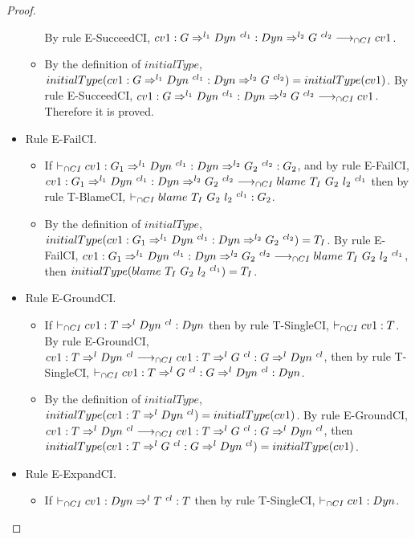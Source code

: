 \documentclass[a4paper]{article}
\begin{document}
\begin{proof}
\begin{itemize}
\begin{itemize}
        By rule E-SucceedCI, $cv1 : G \Rightarrow^{l_1} Dyn\ ^{cl_1} : Dyn \Rightarrow^{l_2} G\ ^{cl_2} \longrightarrow_{\cap CI} cv1$.
        \item By the definition of $initialType$, $initialType(cv1 : G \Rightarrow^{l_1} \Dyn\ ^{cl_1} : \Dyn \Rightarrow^{l_2} G\ ^{cl_2}) = initialType(cv1)$.
        By rule E-SucceedCI, $cv1 : G \Rightarrow^{l_1} Dyn\ ^{cl_1} : Dyn \Rightarrow^{l_2} G\ ^{cl_2} \longrightarrow_{\cap CI} cv1$.
        Therefore it is proved.
    \end{itemize}
    \item Rule E-FailCI.
    \begin{itemize}
        \item If $\vdash_{\cap CI} cv1 : G_1 \Rightarrow^{l_1} Dyn\ ^{cl_1} : Dyn \Rightarrow^{l_2} G_2\ ^{cl_2} : G_2$, and by rule E-FailCI, $cv1 : G_1 \Rightarrow^{l_1} \Dyn\ ^{cl_1} : \Dyn \Rightarrow^{l_2} G_2\ ^{cl_2} \cios \blamecast{T_I}{G_2}{l_2}{cl_1}$ then by rule T-BlameCI, $\vdash_{\cap CI} blame\ T_I\ G_2\ l_2\ ^{cl_1} : G_2$.
        \item By the definition of $initialType$, $initialType(cv1 : G_1 \Rightarrow^{l_1} \Dyn\ ^{cl_1} : \Dyn \Rightarrow^{l_2} G_2\ ^{cl_2}) = T_I$.
        By rule E-FailCI, $cv1 : G_1 \Rightarrow^{l_1} \Dyn\ ^{cl_1} : \Dyn \Rightarrow^{l_2} G_2\ ^{cl_2} \cios \blamecast{T_I}{G_2}{l_2}{cl_1}$, then $initialType(blame\ T_I\ G_2\ l_2\ ^{cl_1}) = T_I$.
    \end{itemize}
    \item Rule E-GroundCI.
    \begin{itemize}
        \item If $\cits cv1 : T \Rightarrow^l \Dyn\ ^{cl} : \Dyn$ then by rule T-SingleCI, $\vdash_{\cap CI} cv1 : T$.
        By rule E-GroundCI, $cv1 : T \Rightarrow^l Dyn\ ^{cl} \longrightarrow_{\cap CI} cv1 : T \Rightarrow^l G\ ^{cl} : G \Rightarrow^l Dyn\ ^{cl}$, then by rule T-SingleCI, $\vdash_{\cap CI} cv1 : T \Rightarrow^l G\ ^{cl} : G \Rightarrow^l Dyn\ ^{cl} : Dyn$.
        \item By the definition of $initialType$, $initialType(cv1 : T \Rightarrow^l \Dyn\ ^{cl}) = initialType(cv1)$.
        By rule E-GroundCI, $cv1 : T \Rightarrow^l Dyn\ ^{cl} \longrightarrow_{\cap CI} cv1 : T \Rightarrow^l G\ ^{cl} : G \Rightarrow^l Dyn\ ^{cl}$, then $initialType(cv1 : T \Rightarrow^l G\ ^{cl} : G \Rightarrow^l Dyn\ ^{cl}) = initialType(cv1)$.
    \end{itemize}
    \item Rule E-ExpandCI.
    \begin{itemize}
        \item If $\cits cv1 : \Dyn \Rightarrow^l T\ ^{cl} : T$ then by rule T-SingleCI, $\vdash_{\cap CI} cv1 : Dyn$.

\end{itemize}
\end{itemize}
\end{proof}
\end{document}
